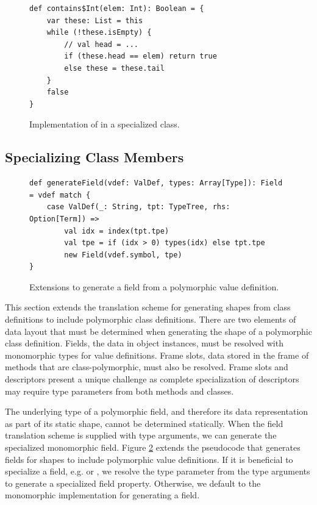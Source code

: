 \begin{figure}[!htb]
\begin{verbatim}
def contains$Int(elem: Int): Boolean = {
	var these: List = this
	while (!these.isEmpty) {
		// val head = ...
		if (these.head == elem) return true
		else these = these.tail
	}
	false
}	
\end{verbatim}
\caption{Implementation of  in a specialized  class.}
\label{impl:cons-contains-specialized}
\end{figure}

\subsection{Specializing Class Members}

\begin{figure}[!htb]
\begin{verbatim}
def generateField(vdef: ValDef, types: Array[Type]): Field = vdef match {
	case ValDef(_: String, tpt: TypeTree, rhs: Option[Term]) => 
		val idx = index(tpt.tpe)
		val tpe = if (idx > 0) types(idx) else tpt.tpe
		new Field(vdef.symbol, tpe)
}
\end{verbatim}
\caption{Extensions to generate a field from a polymorphic value definition.}
\label{impl:generate-poly-field}
\end{figure}

\newpage 

This section extends the translation scheme for generating shapes from class definitions to include polymorphic class definitions.
There are two elements of data layout that must be determined when generating the shape of a polymorphic class definition.
Fields, the data in object instances, must be resolved with monomorphic types for value definitions.
Frame slots, data stored in the frame of methods that are class-polymorphic, must also be resolved.
Frame slots and descriptors present a unique challenge as complete specialization of descriptors may require type parameters from both methods and classes.

The underlying type of a polymorphic field, and therefore its data representation as part of its static shape, cannot be determined statically.
When the field translation scheme is supplied with type arguments, we can generate the specialized monomorphic field.
Figure \ref{impl:generate-poly-field} extends the pseudocode that generates fields for shapes to include polymorphic value definitions.
If it is beneficial to specialize a field, e.g.  or , we resolve the type parameter from the type arguments to generate a specialized field property.
Otherwise, we default to the monomorphic implementation for generating a field.

